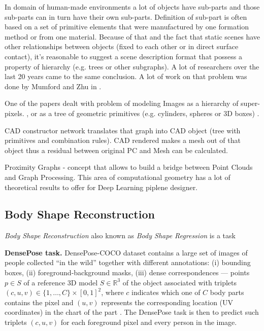 
In domain of human-made environments a lot of objects have sub-parts and those sub-parts can in turn have their own sub-parts. Definition of sub-part is often based on a set of primitive elements that were manufactured by one formation method or from one material. Because of that and the fact that static scenes have other relationships between objects (fixed to each other or in direct surface contact), it's reasonable to suggest a scene description format that possess a property of hierarchy (e.g. trees or other subgraphs).
A lot of researchers over the last 20 years came to the same conclusion. A lot of work on that problem was done by Mumford and Zhu in \cite{zhu2006stochastic}.

One of the papers dealt with problem of modeling Images as a hierarchy of super-pixels. \cite{russell2009associative}, or as a tree of geometric primitives (e.g. cylinders, spheres or 3D boxes) \cite{li2017grass}.

CAD constructor network translates that graph into CAD object (tree with primitives and combination rules). CAD rendered makes a mesh out of that object thus a residual between original PC and Mesh can be calculated.

Proximity Graphs - concept that allows to build a bridge between Point Clouds and Graph Processing. This area of computational geometry has a lot of theoretical results to offer for Deep Learning piplene designer.

\subsection{Body Shape Reconstruction}

\textit{Body Shape Reconstruction} also known as \textit{Body Shape Regression} is a task 

\noindent 
\textbf{DensePose task.} DensePose-COCO dataset contains a large set of images of people collected ``in the wild'' together with different annotations: (i) bounding boxes, (ii) foreground-background masks, (iii) dense correspondences --- points $p \in S$ of a reference 3D model $S\in\mathbb{R}^3$ of the object associated with triplets $(c, u, v) \in\{1, \ldots, C\} \times[0,1]^{2}$, where $c$ indicates which one of $C$ body parts contains the pixel and $(u,v)$ represents the corresponding location (UV coordinates) in the chart of the part \cite{smpl}.
The DensePose task is then to predict such triplets $(c, u, v)$ for each foreground pixel and every person in the image.
\newline

